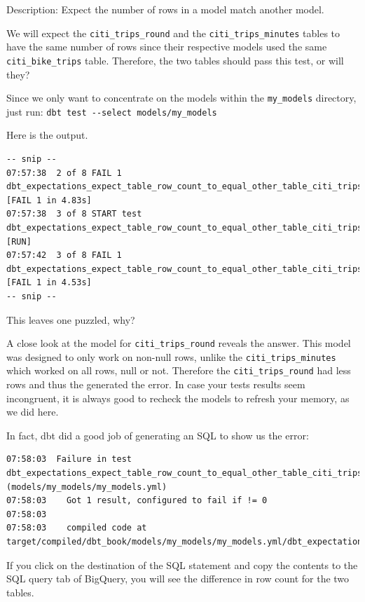 \documentclass[
]{book}
\begin{document}
Description: Expect the number of rows in a model match another model.

We will expect the \texttt{citi\_trips\_round} and the \texttt{citi\_trips\_minutes} tables to have the same number of rows since their respective models used the same \texttt{citi\_bike\_trips} table. Therefore, the two tables should pass this test, or will they?

Since we only want to concentrate on the models within the \texttt{my\_models} directory, just run: \texttt{dbt\ test\ -\/-select\ models/my\_models}

Here is the output.

\begin{verbatim}
-- snip --
07:57:38  2 of 8 FAIL 1 dbt_expectations_expect_table_row_count_to_equal_other_table_citi_trips_minutes_ref_citi_trips_round_  [FAIL 1 in 4.83s]
07:57:38  3 of 8 START test dbt_expectations_expect_table_row_count_to_equal_other_table_citi_trips_round_ref_citi_trips_minutes_  [RUN]
07:57:42  3 of 8 FAIL 1 dbt_expectations_expect_table_row_count_to_equal_other_table_citi_trips_round_ref_citi_trips_minutes_  [FAIL 1 in 4.53s]
-- snip --
\end{verbatim}

This leaves one puzzled, why?

A close look at the model for \texttt{citi\_trips\_round} reveals the answer. This model was designed to only work on non-null rows, unlike the \texttt{citi\_trips\_minutes} which worked on all rows, null or not. Therefore the \texttt{citi\_trips\_round} had less rows and thus the generated the error. In case your tests results seem incongruent, it is always good to recheck the models to refresh your memory, as we did here.

In fact, dbt did a good job of generating an SQL to show us the error:

\begin{verbatim}
07:58:03  Failure in test dbt_expectations_expect_table_row_count_to_equal_other_table_citi_trips_minutes_ref_citi_trips_round_ (models/my_models/my_models.yml)
07:58:03    Got 1 result, configured to fail if != 0
07:58:03  
07:58:03    compiled code at target/compiled/dbt_book/models/my_models/my_models.yml/dbt_expectations_expect_table__c00100dada30a31f15f90b9c1ba0b295.sql
\end{verbatim}

If you click on the destination of the SQL statement and copy the contents to the SQL query tab of BigQuery, you will see the difference in row count for the two tables.
\end{document}
